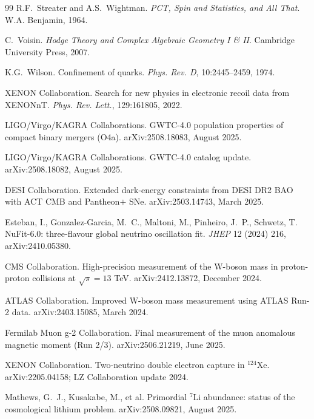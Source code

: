 \documentclass[11pt,a4paper]{amsart}
\theoremstyle{plain}
\theoremstyle{definition}
\begin{document}
\begin{thebibliography}{99}
R.F.~Streater and A.S.~Wightman.
\newblock \emph{PCT, Spin and Statistics, and All That}.
\newblock W.A. Benjamin, 1964.

C.~Voisin.
\newblock \emph{Hodge Theory and Complex Algebraic Geometry I \& II}.
\newblock Cambridge University Press, 2007.

K.G.~Wilson.
\newblock Confinement of quarks.
\newblock \emph{Phys. Rev. D}, 10:2445--2459, 1974.

XENON Collaboration.
\newblock Search for new physics in electronic recoil data from XENONnT.
\newblock \emph{Phys. Rev. Lett.}, 129:161805, 2022.

LIGO/Virgo/KAGRA Collaborations.
\newblock GWTC-4.0 population properties of compact binary mergers (O4a).
\newblock arXiv:2508.18083, August 2025.

LIGO/Virgo/KAGRA Collaborations.
\newblock GWTC-4.0 catalog update.
\newblock arXiv:2508.18082, August 2025.

DESI Collaboration.
\newblock Extended dark-energy constraints from DESI DR2 BAO with ACT CMB and Pantheon$+$ SNe.
\newblock arXiv:2503.14743, March 2025.

Esteban, I., Gonzalez-Garcia, M.~C., Maltoni, M., Pinheiro, J.~P., Schwetz, T.
\newblock NuFit-6.0: three-flavour global neutrino oscillation fit.
\newblock \emph{JHEP} 12 (2024) 216, arXiv:2410.05380.

CMS Collaboration.
\newblock High-precision measurement of the W-boson mass in proton-proton collisions at $\sqrt{s} = 13$ TeV.
\newblock arXiv:2412.13872, December 2024.

ATLAS Collaboration.
\newblock Improved W-boson mass measurement using ATLAS Run-2 data.
\newblock arXiv:2403.15085, March 2024.

Fermilab Muon g-2 Collaboration.
\newblock Final measurement of the muon anomalous magnetic moment (Run 2/3).
\newblock arXiv:2506.21219, June 2025.

XENON Collaboration.
\newblock Two-neutrino double electron capture in ${}^{124}$Xe.
\newblock arXiv:2205.04158; LZ Collaboration update 2024.

Mathews, G.~J., Kusakabe, M., et al.
\newblock Primordial $^7$Li abundance: status of the cosmological lithium problem.
\newblock arXiv:2508.09821, August 2025.


\end{thebibliography}
\end{document}
